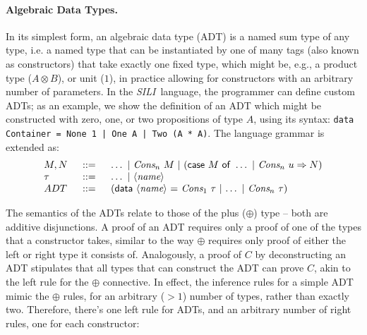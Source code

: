 \documentclass{llncs}
\newcommand{\tensor}{\otimes}
\newcommand{\mypara}[1]{\paragraph{\textbf{#1}.}}
\newcommand{\synname}{\emph{SILI}}
\begin{document}
\mypara{Algebraic Data Types} In its simplest form, an algebraic data type (ADT)
is a named sum type of any type, i.e. a named type that can be instantiated by one of many
tags (also known as constructors) that take exactly one fixed type, which might
be, e.g., a product type ($A \tensor B$), or unit ($1$), in practice allowing
for constructors with an arbitrary number of parameters. In the \synname\
language, the programmer can define custom ADTs; as an example, we show the
definition of an ADT which might be constructed with zero, one, or two
propositions of type $A$, using its syntax: \texttt{data Container
= None 1 | One A | Two (A * A)}. The language grammar is extended as:
\[
\begin{tabular}{lclc}
    $M,N$ & $\ ::=\ $ & $\dots\ \vert\ \emph{Cons}_n\ M\ \vert\ (\mathsf{case}\
    M\ \mathsf{of}\ \dots\ \vert\ \emph{Cons}_n\ u \Rightarrow N)$ \\
    $\tau$ & $\ ::=\ $ & $\dots\ \vert\ \langle\emph{name}\rangle$ \\
    $ADT$ & $\ ::=\ $ & (\textsf{data} $\langle\emph{name}\rangle$\ $=$\ $\emph{Cons}_1\ \tau$\
$\vert$\ $\dots$\ $\vert$\ $\emph{Cons}_n\ \tau$) \\ \end{tabular}
\]

The semantics of the ADTs relate to those of the plus ($\oplus$) type --
both are additive disjunctions.  A proof of an ADT requires only a proof of one
of the types that a constructor takes, similar to the way $\oplus$ requires only
proof of either the left or right type it consists of. Analogously, a proof of
$C$ by deconstructing an ADT stipulates that all types that can construct the
ADT can prove $C$, akin to the left rule for the $\oplus$ connective. In effect,
the inference rules for a simple ADT mimic the $\oplus$ rules, for an
arbitrary ($>1$) number of types, rather than exactly two. Therefore, there's one
left rule for ADTs, and an arbitrary number of right rules, one for each
constructor:
\end{document}
